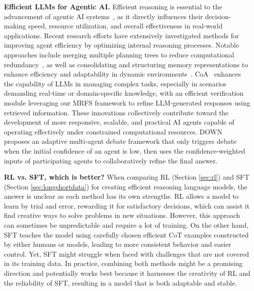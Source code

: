 \textbf{Efficient LLMs for Agentic AI.} Efficient reasoning is essential to the advancement of agentic AI systems~\cite{liu2025advances}, as it directly influences their decision-making speed, resource utilization, and overall effectiveness in real-world applications. Recent research efforts have extensively investigated methods for improving agent efficiency by optimizing internal reasoning processes. Notable approaches include merging multiple planning trees to reduce computational redundancy~\cite{hu2023tree}, as well as consolidating and structuring memory representations to enhance efficiency and adaptability in dynamic environments~\cite{hu2024hiagent}. CoA~\cite{pan2024chain} enhances the capability of LLMs in managing complex tasks, especially in scenarios demanding real-time or domain-specific knowledge, with an efficient verification module leveraging our MRFS framework to refine LLM-generated responses using retrieved information. These innovations collectively contribute toward the development of more responsive, scalable, and practical AI agents capable of operating effectively under constrained computational resources. DOWN~\cite{eo2025debatenecessaryadaptivemultiagent} proposes an adaptive multi‑agent debate framework that only triggers debate when the initial confidence of an agent is low, then uses the confidence‑weighted inputs of participating agents to collaboratively refine the final answer.

\textbf{RL vs. SFT, which is better?} When comparing RL (Section \ref{sec:rl}) and SFT (Section \ref{sec:longshortdata}) for creating efficient reasoning language models, the answer is unclear as each method has its own strengths. RL allows a model to learn by trial and error, rewarding it for satisfactory decisions, which can assist it find creative ways to solve problems in new situations. However, this approach can sometimes be unpredictable and require a lot of training. On the other hand, SFT teaches the model using carefully chosen efficient CoT examples constructed by either humans or models, leading to more consistent behavior and easier control. Yet, SFT might struggle when faced with challenges that are not covered in its training data. In practice, combining both methods might be a promising direction and potentially works best because it harnesses the creativity of RL and the reliability of SFT, resulting in a model that is both adaptable and stable.
